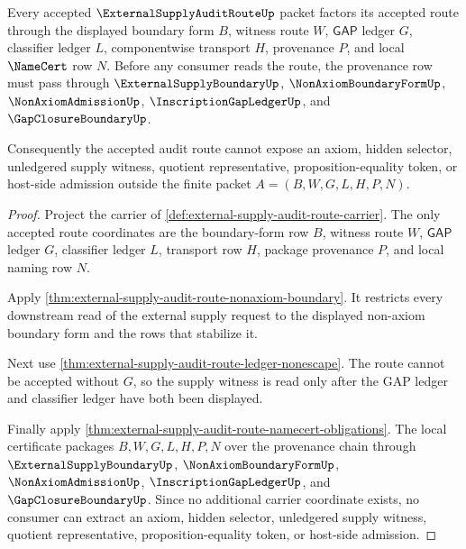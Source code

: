 \begin{theorem}
\label{thm:external-supply-audit-route-gap-ledger-factorization}
Every accepted $\ExternalSupplyAuditRouteUp$ packet factors its accepted route
through the displayed boundary form $B$, witness route $W$, $\mathsf{GAP}$
ledger $G$, classifier ledger $L$, componentwise transport $H$, provenance
$P$, and local $\NameCert$ row $N$. Before any consumer reads the route, the
provenance row must pass through $\ExternalSupplyBoundaryUp$,
$\NonAxiomBoundaryFormUp$, $\NonAxiomAdmissionUp$,
$\InscriptionGapLedgerUp$, and $\GapClosureBoundaryUp$.

Consequently the accepted audit route cannot expose an axiom, hidden selector,
unledgered supply witness, quotient representative, proposition-equality token,
or host-side admission outside the finite packet $A=(B,W,G,L,H,P,N)$.
\end{theorem}
\begin{proof}
Project the carrier of \autoref{def:external-supply-audit-route-carrier}. The
only accepted route coordinates are the boundary-form row $B$, witness route
$W$, $\mathsf{GAP}$ ledger $G$, classifier ledger $L$, transport row $H$,
package provenance $P$, and local naming row $N$.

Apply \autoref{thm:external-supply-audit-route-nonaxiom-boundary}. It restricts
every downstream read of the external supply request to the displayed
non-axiom boundary form and the rows that stabilize it.

Next use \autoref{thm:external-supply-audit-route-ledger-nonescape}. The route
cannot be accepted without $G$, so the supply witness is read only after the
GAP ledger and classifier ledger have both been displayed.

Finally apply
\autoref{thm:external-supply-audit-route-namecert-obligations}. The local
certificate packages $B,W,G,L,H,P,N$ over the provenance chain through
$\ExternalSupplyBoundaryUp$, $\NonAxiomBoundaryFormUp$,
$\NonAxiomAdmissionUp$, $\InscriptionGapLedgerUp$, and
$\GapClosureBoundaryUp$. Since no additional carrier coordinate exists, no
consumer can extract an axiom, hidden selector, unledgered supply witness,
quotient representative, proposition-equality token, or host-side admission.
\end{proof}



